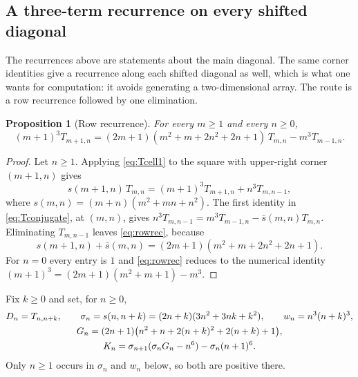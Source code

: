 \documentclass[11pt,letterpaper]{article}
\numberwithin{equation}{section}
\newtheorem{proposition}[theorem]{Proposition}
\theoremstyle{definition}
\begin{document}
\subsection{A three-term recurrence on every shifted diagonal}\label{sec:shiftrec}

The recurrences above are statements about the main diagonal. The same
corner identities give a recurrence along each shifted diagonal as well,
which is what one wants for computation: it avoids generating a
two-dimensional array. The route is a row recurrence followed by one
elimination.

\begin{proposition}[Row recurrence]\label{prop:rowrec}
For every $m\geq1$ and every $n\geq0$,
\begin{equation}\label{eq:rowrec}
 (m+1)^3T_{m+1,n}
 =(2m+1)(m^2+m+2n^2+2n+1)\,T_{m,n}-m^3T_{m-1,n}.
\end{equation}
\end{proposition}
\begin{proof}
Let $n\geq1$. Applying \eqref{eq:Tcell1} to the square with upper-right
corner $(m+1,n)$ gives
\[
 s(m+1,n)\,T_{m,n}=(m+1)^3T_{m+1,n}+n^3T_{m,n-1},
\]
where $s(m,n)=(m+n)(m^2+mn+n^2)$. The first identity in
\eqref{eq:Tconjugate}, at $(m,n)$, gives
$n^3T_{m,n-1}=m^3T_{m-1,n}-\bar s(m,n)T_{m,n}$. Eliminating
$T_{m,n-1}$ leaves \eqref{eq:rowrec}, because
\[
 s(m+1,n)+\bar s(m,n)=(2m+1)(m^2+m+2n^2+2n+1).
\]
For $n=0$ every entry is $1$ and \eqref{eq:rowrec} reduces to the
numerical identity $(m+1)^3=(2m+1)(m^2+m+1)-m^3$.
\end{proof}

Fix $k\geq0$ and set, for $n\geq0$,
\begin{gather}
 D_n=T_{n,n+k},\qquad
 \sigma_n=s(n,n+k)=(2n+k)(3n^2+3nk+k^2),\qquad
 w_n=n^3(n+k)^3,\label{eq:recdefs}\\
 G_n=(2n+1)\bigl(n^2+n+2(n+k)^2+2(n+k)+1\bigr),\notag\\
 K_n=\sigma_{n+1}(\sigma_nG_n-n^6)-\sigma_n(n+1)^6.\label{eq:Kn}
\end{gather}
Only $n\geq1$ occurs in $\sigma_n$ and $w_n$ below, so both are positive
there.
\end{document}
